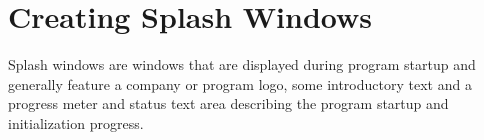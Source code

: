 
\chapter{Creating Splash Windows}
\label{chapt:SplashWindows}

Splash windows are windows that are displayed during program startup
and generally feature a company or program logo, some introductory text
and a progress meter and status text area describing the program startup
and initialization progress.

